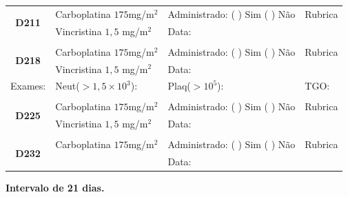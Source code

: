 \documentclass[11pt,a4paper,oldfontcommands]{memoir}
\begin{document}
\begin{center}
\begin{longtable}{p{1cm}p{4cm}|p{5cm}|p{3cm}}
    \hline
    \multicolumn{1}{c|}{\multirow{2}{*}{\textbf{D211}}}&{Carboplatina \(175\)mg/m\(^2\)}&{Administrado: (  ) Sim (  ) Não}&{Rubrica}\\
    \multicolumn{1}{c|}{}&{Vincristina \(1,5\) mg/m\(^2\)}&{Data:}&\\
    \hline
    \\
    \hline
    \multicolumn{1}{c|}{\multirow{2}{*}{\textbf{D218}}}&{Carboplatina \(175\)mg/m\(^2\)}&{Administrado: (  ) Sim (  ) Não}&{Rubrica}\\
    \multicolumn{1}{c|}{}&{Vincristina \(1,5\) mg/m\(^2\)}&{Data:}&\\
    \hline
    \multicolumn{1}{c|}{Exames:}&{Neut(\(>1,5\times10^3\)):}&{Plaq(\(>10^5\)):}&{TGO:}
    \\
    \hline
    \\
    \hline
    \multicolumn{1}{c|}{\multirow{2}{*}{\textbf{D225}}}&{Carboplatina \(175\)mg/m\(^2\)}&{Administrado: (  ) Sim (  ) Não}&{Rubrica}\\
    \multicolumn{1}{c|}{}&{Vincristina \(1,5\) mg/m\(^2\)}&{Data:}&\\
    \hline
    \\
    \hline
    \multicolumn{1}{c|}{\multirow{2}{*}{\textbf{D232}}}&{Carboplatina \(175\)mg/m\(^2\)}&{Administrado: (  ) Sim (  ) Não}&{Rubrica}\\
	\multicolumn{1}{c|}{}&&{Data:}&\\
    \hline
\end{longtable}
\textbf{Intervalo de 21 dias.}
\end{center}
\clearpage
\end{document}
